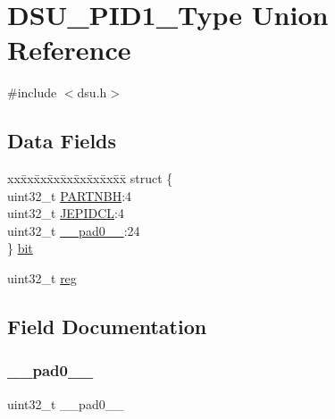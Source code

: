 \hypertarget{union_d_s_u___p_i_d1___type}{}\section{D\+S\+U\+\_\+\+P\+I\+D1\+\_\+\+Type Union Reference}
\label{union_d_s_u___p_i_d1___type}


{\ttfamily \#include $<$dsu.\+h$>$}

\subsection*{Data Fields}
\begin{DoxyCompactItemize}
\item 
\begin{tabbing}
xx\=xx\=xx\=xx\=xx\=xx\=xx\=xx\=xx\=\kill
struct \{\\
\>uint32\_t \mbox{\hyperlink{union_d_s_u___p_i_d1___type_a2c986ac59c285a22c13815824d169842}{PARTNBH}}:4\\
\>uint32\_t \mbox{\hyperlink{union_d_s_u___p_i_d1___type_a0f4893153b1ef366310a83de468f0a08}{JEPIDCL}}:4\\
\>uint32\_t \mbox{\hyperlink{union_d_s_u___p_i_d1___type_a3e57c2ef1c3ffb36722f000cc1156824}{\_\_pad0\_\_}}:24\\
\} \mbox{\hyperlink{union_d_s_u___p_i_d1___type_a50dd8eedbda7ba9ff27c0badd5f45ad8}{bit}}\\

\end{tabbing}\item 
uint32\+\_\+t \mbox{\hyperlink{union_d_s_u___p_i_d1___type_a6b91636401516a477989a336376d7b40}{reg}}
\end{DoxyCompactItemize}


\subsection{Field Documentation}
\mbox{\label{union_d_s_u___p_i_d1___type_a3e57c2ef1c3ffb36722f000cc1156824}} 
\subsubsection{\texorpdfstring{\_\_pad0\_\_}{\_\_pad0\_\_}}
{\footnotesize\ttfamily uint32\+\_\+t \+\_\+\+\_\+pad0\+\_\+\+\_\+}


